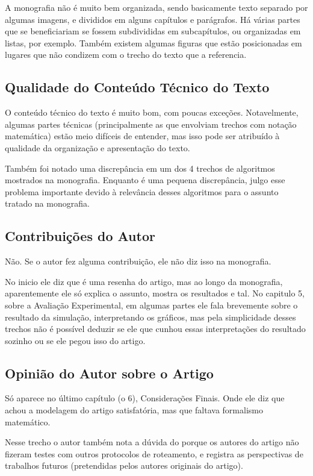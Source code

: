 \documentclass[a4paper,11pt]{article}
\begin{document}
A monografia não é muito bem organizada, sendo basicamente texto separado por algumas imagens,
e divididos em alguns capítulos e parágrafos. Há várias partes que se beneficiariam se fossem subdivididas
em subcapítulos, ou organizadas em listas, por exemplo. Também existem algumas figuras que estão
posicionadas em lugares que não condizem com o trecho do texto que a referencia.

\subsection{Qualidade do Conteúdo Técnico do Texto}
O conteúdo técnico do texto é muito bom, com poucas exceções. Notavelmente, algumas partes técnicas
(principalmente as que envolviam trechos com notação matemática) estão meio difíceis de entender,
mas isso pode ser atribuído à qualidade da organização e apresentação do texto.

Também foi notado uma discrepância em um dos 4 trechos de algoritmos mostrados na monografia. Enquanto
é uma pequena discrepância, julgo esse problema importante devido à relevância desses algoritmos para
o assunto tratado na monografia.

\subsection{Contribuições do Autor}
Não. Se o autor fez alguma contribuição, ele não diz isso na monografia.

No inicio ele diz que é uma resenha do artigo, mas ao longo da monografia, 
aparentemente ele só explica o assunto, mostra os resultados e tal. No capitulo 5,
sobre a Avaliação Experimental, em algumas partes ele fala brevemente sobre o resultado da simulação,
interpretando os gráficos, mas pela simplicidade desses trechos não é possível deduzir se ele
que cunhou essas interpretações do resultado sozinho ou se ele pegou isso do artigo.

\subsection{Opinião do Autor sobre o Artigo}
Só aparece no último capítulo (o 6), Considerações Finais. Onde ele diz que achou a modelagem
do artigo satisfatória, mas que faltava formalismo matemático.

Nesse trecho o autor também nota a dúvida do porque os autores do artigo não fizeram testes
com outros protocolos de roteamento, e registra as perspectivas de trabalhos futuros (pretendidas
pelos autores originais do artigo).
\end{document}
